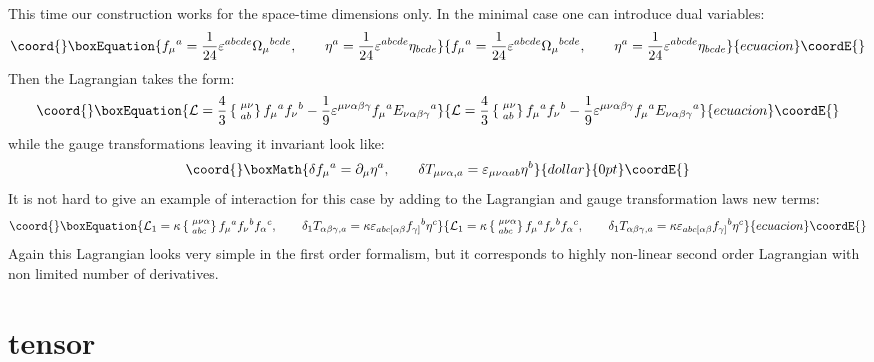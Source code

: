 \documentclass[a4paper,12pt]{article}
\begin{document}
This time our construction works for the space-time dimensions
\coordHE{} only. In the minimal \coordHE{} case one can introduce dual
variables:
\begin{equation}\coord{}\boxEquation{
f_\mu{}^a = \frac{1}{24} \varepsilon^{abcde} \Omega_\mu{}^{bcde},
\qquad \eta^a = \frac{1}{24} \varepsilon^{abcde} \eta_{bcde}
}{
f_\mu{}^a = \frac{1}{24} \varepsilon^{abcde} \Omega_\mu{}^{bcde},
\qquad \eta^a = \frac{1}{24} \varepsilon^{abcde} \eta_{bcde}
}{ecuacion}\coordE{}\end{equation}
Then the Lagrangian takes the form:
\begin{equation}\coord{}\boxEquation{
{\cal L} = \frac{4}{3} \left\{ \phantom{|}^{\mu\nu}_{ab} \right\}
f_\mu{}^a f_\nu{}^b - \frac{1}{9}
\varepsilon^{\mu\nu\alpha\beta\gamma} f_\mu{}^a
E_{\nu\alpha\beta\gamma}{}^a
}{
{\cal L} = \frac{4}{3} \left\{ \phantom{|}^{\mu\nu}_{ab} \right\}
f_\mu{}^a f_\nu{}^b - \frac{1}{9}
\varepsilon^{\mu\nu\alpha\beta\gamma} f_\mu{}^a
E_{\nu\alpha\beta\gamma}{}^a
}{ecuacion}\coordE{}\end{equation}
while the gauge transformations leaving it invariant look like:
$$\coord{}\boxMath{
\delta f_\mu{}^a = \partial_\mu \eta^a, \qquad \delta
T_{\mu\nu\alpha,a} = \varepsilon_{\mu\nu\alpha ab} \eta^b
}{dollar}{0pt}\coordE{}$$
It is not hard to give an example of interaction for this case by
adding to the Lagrangian and gauge transformation laws new terms:
\begin{equation}\coord{}\boxEquation{
{\cal L}_1 =\kappa \left\{ \phantom{|}^{\mu\nu\alpha}_{abc} \right\}
f_\mu{}^a f_\nu{}^b f_\alpha{}^c, \qquad \delta_1
T_{\alpha\beta\gamma,a} = \kappa
\varepsilon_{abc[\alpha\beta} f_{\gamma]}{}^b \eta^c
}{
{\cal L}_1 =\kappa \left\{ \phantom{|}^{\mu\nu\alpha}_{abc} \right\}
f_\mu{}^a f_\nu{}^b f_\alpha{}^c, \qquad \delta_1
T_{\alpha\beta\gamma,a} = \kappa
\varepsilon_{abc[\alpha\beta} f_{\gamma]}{}^b \eta^c
}{ecuacion}\coordE{}\end{equation}
Again this Lagrangian looks very simple in the first order formalism,
but it corresponds to highly non-linear second order Lagrangian with
non limited number of derivatives.


\section{\coordHE{} tensor}
\end{document}
